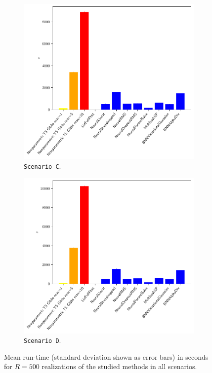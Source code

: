 \begin{figure}[!h]
	\begin{subfigure}[c]{0.45\textwidth}
		\includegraphics[width=\textwidth]{./figs/linear_gaussian_mixture_unbalanced/exec_time_barplot}
		\vspace*{-5ex}
		\caption{\texttt{Scenario C}.}
		\label{afig:scenario_C_exec_times}
	\end{subfigure}
	\begin{subfigure}[c]{0.45\textwidth}
		\includegraphics[width=\textwidth]{./figs/linear_gaussian_mixture_heavy_tail/exec_time_barplot}
		\vspace*{-5ex}
		\caption{\texttt{Scenario D}.}
		\label{afig:scenario_D_exec_times}
	\end{subfigure}
	\vspace*{-2ex}
	\caption{Mean run-time (standard deviation shown as error bars) in seconds for $R=500$ realizations  of the studied methods in all scenarios.}
	\label{afig:mixture_scenarios_bandit_showdown_exec_times}
\end{figure}


